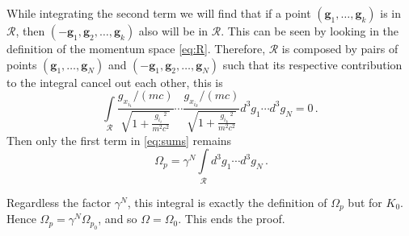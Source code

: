 \documentclass[11pt]{article}
\theoremstyle{definition}     %
\theoremstyle{definition}     %
\def\be{\begin{equation}}
\def\ee{\end{equation}}
\begin{document}
While integrating the second term we will find that if a point $(\mathbf{g}_1,\dots,\mathbf{g}_k)$ is in $\mathcal{R}$, then $(-\mathbf{g}_1,\mathbf{g}_2,\dots,\mathbf{g}_k)$ also will be in $\mathcal{R}$. This can be seen by looking in the definition of the momentum space \ref{eq:R}. Therefore, $\mathcal{R}$ is composed by pairs of points $(\mathbf{g}_1,\dots,\mathbf{g}_N)$ and $(-\mathbf{g}_1,\mathbf{g}_2,\dots,\mathbf{g}_N)$ such that its respective contribution to the integral cancel out each other, this is 
\be 
	\int\limits_\mathcal{R} \frac{g_{x_{i_1}}/(mc)}{\sqrt{1+\frac{g_{i_i}\,^2}{m^2c^2}}} \cdots \frac{g_{x_{i_k}}/(mc)}{\sqrt{1+\frac{g_{i_k}\,^2}{m^2c^2}}} d^3 g_1 \cdots d^3g_N = 0\,.
\ee
Then only the first term in \ref{eq:sums} remains
\be 
\	\Omega_p =  \gamma^N \int\limits_\mathcal{R} d^3 g_1 \cdots d^3g_N\,.
\ee

Regardless the factor $\gamma^N$, this integral is exactly the definition of $\Omega_p$ but for $K_0$. Hence $\Omega_p=\gamma^N \Omega_{p_0}$, and so $\Omega=\Omega_0$. This ends the proof.




\end{document}
